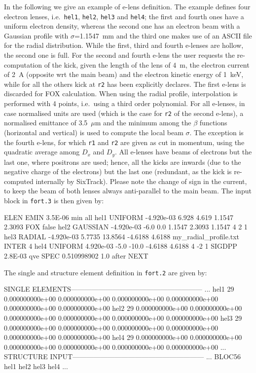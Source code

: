In the following we give an example of e-lens definition.
The example defines four electron lenses, i.e.~\texttt{hel1}, \texttt{hel2}, \texttt{hel3} and \texttt{hel4}; the first and fourth ones have a uniform electron density, whereas the second one has an electron beam with a Gaussian profile with $\sigma$=1.1547~mm and the third one makes use of an ASCII file for the radial distribution.
While the first, third and fourth e-lenses are hollow, the second one is full.
For the second and fourth e-lens the user requests the re-computation of the kick, given the length of the lens of 4~m, the electron current of 2~A (opposite wrt the main beam) and the electron kinetic energy of 1~keV, while for all the others kick at \texttt{r2} has been explicitly declares.
The first e-lens is discarded for FOX calculation.
When using the radial profile, interpolation is performed with 4 points, i.e.~using a third order polynomial.
For all e-lenses, in case normalised units are used (which is the case for \texttt{r2} of the second e-lens), a normalised emittance of 3.5~$\mu$m and the minimum among the $\beta$ functions (horizontal and vertical) is used to compute the local beam $\sigma$. The exception is the fourth e-lens, for which \texttt{r1} and \texttt{r2} are given as cut in momentum, using the quadratic average among $D_x$ and $D_y$.
All e-lenses have beams of electrons but the last one, where positrons are used; hence, all the kicks are inwards (due to the negative charge of the electrons) but the last one (redundant, as the kick is re-computed internally by SixTrack).
Please note the change of sign in the current, to keep the beam of both lenses always anti-parallel to the main beam.
The input block in \texttt{fort.3} is then given by:

\begin{cverbatim}
ELEN
EMIN 3.5E-06 min all  
hel1 UNIFORM  -4.920e-03 6.928 4.619 1.1547 2.3093
FOX false
hel2 GAUSSIAN -4.920e-03 -6.0 0.0 1.1547 2.3093 1.1547 4 2 1
hel3 RADIAL   -4.920e-03 5.7735 13.8564  -4.6188  4.6188  my_radial_profile.txt
INTER 4
hel4 UNIFORM   4.920e-03 -5.0 -10.0  -4.6188  4.6188 4 -2 1
SIGDPP 2.8E-03 qve
SPEC 0.510998902  1.0 after
NEXT
\end{cverbatim}
The single and structure element definition in \texttt{fort.2} are given by:
\begin{ctverbatim}
SINGLE ELEMENTS---------------------------------------------------------
...
hel1            29  0.000000000e+00  0.000000000e+00  0.000000000e+00  0.000000000e+00  0.000000000e+00  0.000000000e+00
hel2            29  0.000000000e+00  0.000000000e+00  0.000000000e+00  0.000000000e+00  0.000000000e+00  0.000000000e+00
hel3            29  0.000000000e+00  0.000000000e+00  0.000000000e+00  0.000000000e+00  0.000000000e+00  0.000000000e+00
hel4            29  0.000000000e+00  0.000000000e+00  0.000000000e+00  0.000000000e+00  0.000000000e+00  0.000000000e+00
...
STRUCTURE INPUT---------------------------------------------------------
...
BLOC56            hel1              hel2              hel3              hel4
...
\end{ctverbatim}

